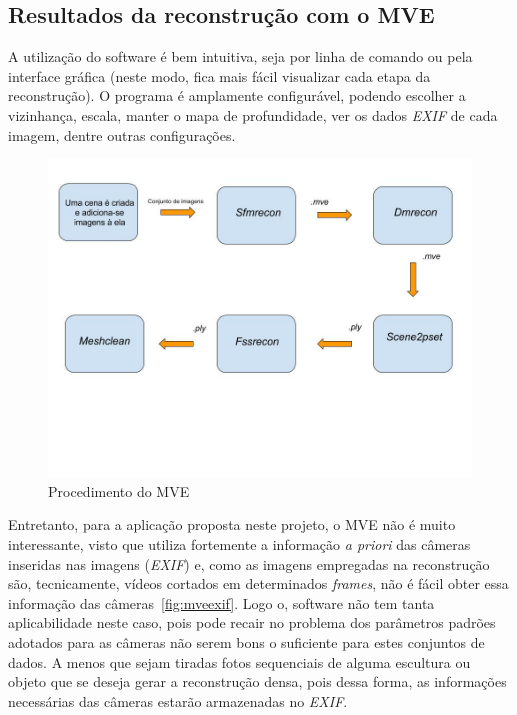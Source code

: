 
\subsection{Resultados da reconstrução com o MVE}

A utilização do software é bem intuitiva, seja por linha de comando ou pela
interface gráfica (neste modo, fica mais fácil visualizar cada etapa da
reconstrução). O programa é amplamente configurável, podendo escolher a vizinhança, escala,
manter o mapa de profundidade, ver os dados \emph{EXIF} de cada imagem, dentre
outras configurações.


\begin{figure}[!h]
	\centering
	\caption{Procedimento do MVE}
	\includegraphics[width=0.5\linewidth]{figs/pipelineMVE.jpg}
\end{figure}

Entretanto, para a aplicação proposta neste projeto, o MVE não é muito interessante,
visto que utiliza fortemente a informação \emph{a priori} das câmeras inseridas nas imagens
(\emph{EXIF}) e, como as imagens empregadas na reconstrução são, tecnicamente,
vídeos cortados em determinados \emph{frames}, não é fácil obter essa informação
das câmeras~\ref{fig:mveexif}. Logo o, software não tem tanta aplicabilidade
neste caso, pois pode recair no problema dos parâmetros padrões adotados para as
câmeras não serem bons o suficiente para estes conjuntos de dados. A menos que
sejam tiradas fotos sequenciais de alguma escultura ou objeto que se deseja
gerar a reconstrução densa, pois dessa forma, as informações necessárias das
câmeras estarão armazenadas no \emph{EXIF}. 

